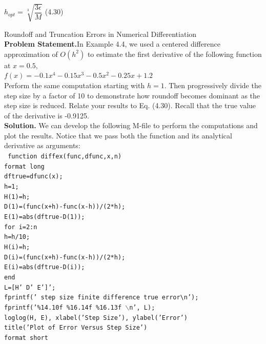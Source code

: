 \documentclass[../main.tex]{subfiles}
\begin{document}
$h_{opt}=\sqrt[3]{\dfrac{3\epsilon}{M}}$
\hfill
(4.30)\\

\begin{example} Roundoff and Truncation Errors in Numerical Differentiation\\

    \noindent\textbf{Problem Statement.}\quad In Example 4.4, we used a centered difference approximation of
    $O(h^2)$ to estimate the first derivative of the following function at $x = 0.5$,\\

    $f(x) = -0.1x^4 - 0.15x^3 - 0.5x^2 -0.25x + 1.2$\\

    \noindent
    Perform the same computation starting with $h = 1$. Then progressively divide the step size
    by a factor of 10 to demonstrate how roundoff becomes dominant as the step size is reduced.
    Relate your results to Eq. (4.30). Recall that the true value of the derivative is -0.9125.\\

    \noindent
    \textbf{Solution.} We can develop the following M-file to perform the computations and plot the
    results. Notice that we pass both the function and its analytical derivative as arguments:\\
    \texttt{\noindent 
    function diffex(func,dfunc,x,n)\\
    format long\\
    dftrue=dfunc(x);\\
    h=1;\\
    H(1)=h;\\
    D(1)=(func(x+h)-func(x-h))/(2*h);\\
    E(1)=abs(dftrue-D(1));\\
    for i=2:n\\
    \indent h=h/10;\\
    \indent H(i)=h;\\
    \indent D(i)=(func(x+h)-func(x-h))/(2*h);\\
    \indent E(i)=abs(dftrue-D(i));\\
    end\\
    L=[H' D' E']';\\
    fprintf(' step size finite difference true error\textbackslash n');\\
    fprintf('\%14.10f \%16.14f \%16.13f $\backslash$n', L);\\
    loglog(H, E), xlabel('Step Size'), ylabel('Error')\\
    title('Plot of Error Versus Step Size')\\
    format short\\}


\end{example}
\end{document}
